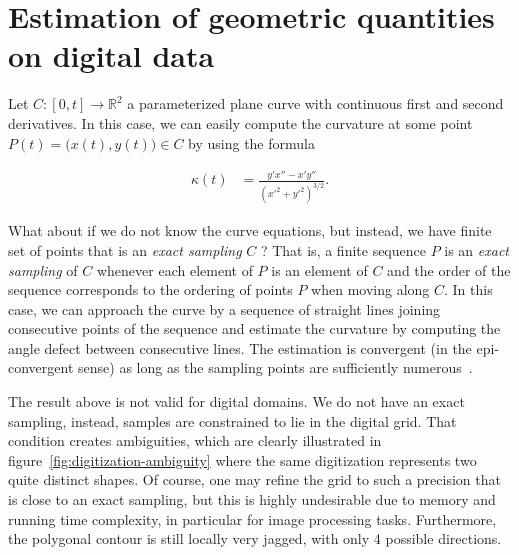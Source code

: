 \documentclass[smallextended]{svjour3}
\begin{document}
\section{Estimation of geometric quantities on digital data}

Let $C:[0,t] \rightarrow \mathbb{R}^2$ a parameterized plane curve with continuous first and second derivatives. In this case, we can easily compute the curvature at some point $P(t) = \big( x(t),y(t) \big) \in C$ by using the formula

\begin{align*}
\kappa (t) &= \frac{y'x'' -x'y''}{(x'^2 + y'^2)^{3/2}}.
\end{align*}

What about if we do not know the curve equations, but instead, we have finite set of points that is an \emph{exact sampling} $C$ ? That is, a finite sequence $P$ is an {\em exact sampling} of $C$ whenever each element of $P$ is an element of $C$ and the order of the sequence corresponds to the ordering of points $P$ when moving along $C$. In this case, we can approach the curve by a sequence of straight lines joining consecutive points of the sequence and estimate the curvature by computing the angle defect between consecutive lines. The estimation is convergent (in the epi-convergent sense) as long as the sampling points are sufficiently numerous~\cite{bruckstein01discrete,bruckstein01convergence}.

The result above is not valid for digital domains. We do not have an exact sampling, instead, samples are constrained to lie in the digital grid. That condition creates ambiguities, which are clearly illustrated in figure~\ref{fig:digitization-ambiguity} where the same digitization represents two quite distinct shapes. Of course, one may refine the grid to such a precision that is close to an exact sampling, but this is highly undesirable due to memory and running time complexity, in particular for image processing tasks. Furthermore, the polygonal contour is still locally very jagged, with only 4 possible directions.
\end{document}
